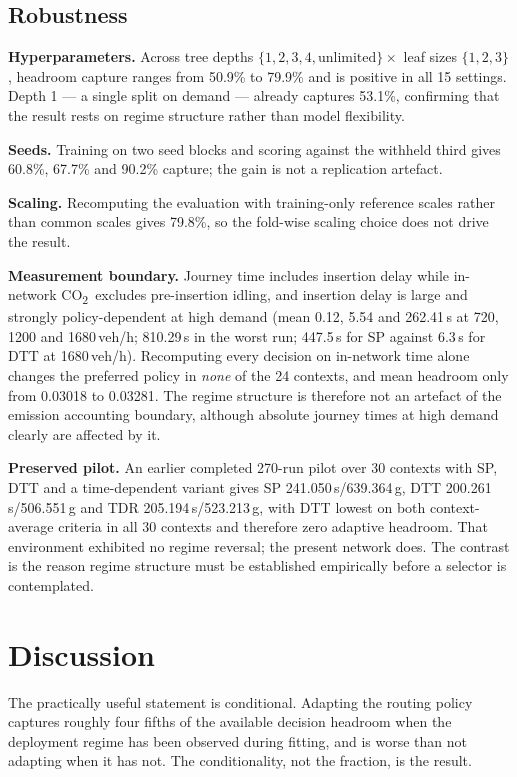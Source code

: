 \documentclass[10pt,a4paper]{article}
\newcommand{\CO}{CO\textsubscript{2}}
\begin{document}
\subsection{Robustness}\label{sec:robust}
\textbf{Hyperparameters.} Across tree depths $\{1,2,3,4,\text{unlimited}\}\times$ leaf sizes $\{1,2,3\}$, headroom capture ranges from 50.9\% to 79.9\% and is positive in all 15 settings. Depth 1 --- a single split on demand --- already captures 53.1\%, confirming that the result rests on regime structure rather than model flexibility.

\textbf{Seeds.} Training on two seed blocks and scoring against the withheld third gives 60.8\%, 67.7\% and 90.2\% capture; the gain is not a replication artefact.

\textbf{Scaling.} Recomputing the evaluation with training-only reference scales rather than common scales gives 79.8\%, so the fold-wise scaling choice does not drive the result.

\textbf{Measurement boundary.} Journey time includes insertion delay while in-network \CO\ excludes pre-insertion idling, and insertion delay is large and strongly policy-dependent at high demand (mean 0.12, 5.54 and 262.41\,s at 720, 1200 and 1680\,veh/h; 810.29\,s in the worst run; 447.5\,s for SP against 6.3\,s for DTT at 1680\,veh/h). Recomputing every decision on in-network time alone changes the preferred policy in \emph{none} of the 24 contexts, and mean headroom only from 0.03018 to 0.03281. The regime structure is therefore not an artefact of the emission accounting boundary, although absolute journey times at high demand clearly are affected by it.

\textbf{Preserved pilot.} An earlier completed 270-run pilot over 30 contexts with SP, DTT and a time-dependent variant gives SP 241.050\,s/639.364\,g, DTT 200.261\,s/506.551\,g and TDR 205.194\,s/523.213\,g, with DTT lowest on both context-average criteria in all 30 contexts and therefore zero adaptive headroom. That environment exhibited no regime reversal; the present network does. The contrast is the reason regime structure must be established empirically before a selector is contemplated.

\section{Discussion}
The practically useful statement is conditional. Adapting the routing policy captures roughly four fifths of the available decision headroom when the deployment regime has been observed during fitting, and is worse than not adapting when it has not. The conditionality, not the fraction, is the result.
\end{document}
